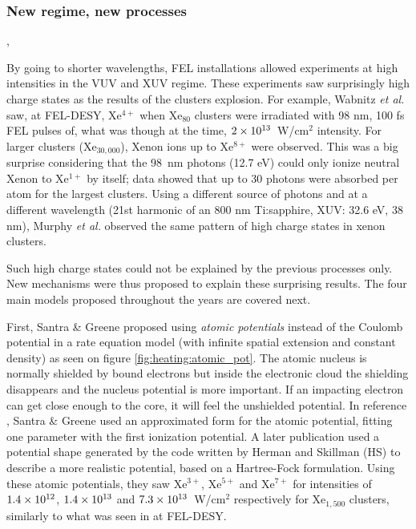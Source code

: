 \subsubsection{New regime, new processes}
\label{section:intro:mechanisms:new},

By going to shorter wavelengths, FEL installations allowed experiments at high
intensities in the VUV and XUV regime. These experiments saw surprisingly
high charge states as the results of the clusters
explosion\cite{Wabnitz2002,Bostedt2010}. For example, Wabnitz \textit{et al.}
saw, at FEL-DESY, Xe$^{4+}$ when Xe$_{80}$ clusters were irradiated with 98 nm,
100 fs FEL pulses of, what was though at the time, $\ten{2}{13}$~W/cm$^2$
intensity. For larger clusters (Xe$_{30,000}$), Xenon
ions
up to
Xe$^{8+}$ were observed. This was a big surprise considering that the 98~nm
photons (12.7 eV) could only ionize neutral Xenon to Xe$^{1+}$ by itself;
data showed that up to 30 photons were absorbed per atom for the largest
clusters. Using a different source of photons and at a different wavelength
(21st harmonic of an 800 nm Ti:sapphire, XUV: 32.6 eV, 38 nm),
Murphy \textit{et al.} observed the same pattern of high charge states in xenon
clusters\cite{Murphy2008a,Murphy2008b}.

Such high charge states could not be explained by the previous processes only.
New mechanisms were thus proposed to explain these surprising results.
The four main models proposed throughout the years are covered next.



First, Santra \& Greene proposed using \textit{atomic potentials} instead of
the Coulomb potential in a rate equation model (with infinite
spatial
%
extension and
constant density) as seen on figure \ref{fig:heating:atomic_pot}.
The atomic nucleus is normally shielded by bound electrons but inside the
electronic cloud the shielding disappears and the nucleus potential is more
important. If an impacting electron can get close enough to the core, it will
feel the unshielded potential.
In reference \cite{Greene2003}, Santra \& Greene used an approximated form for
the atomic potential, fitting one parameter with the first ionization potential.
A later\cite{Walters2006} publication used a
potential shape generated by the code written by Herman and
Skillman\cite{HS1963} (HS) to describe a more
realistic
%
potential, based on a
Hartree-Fock formulation. Using these atomic potentials, they saw Xe$^{3+}$,
Xe$^{5+}$ and Xe$^{7+}$ for intensities of $\ten{1.4}{12}$, $\ten{1.4}{13}$ and
$\ten{7.3}{13}$~W/cm$^2$ respectively for Xe$_{1,500}$ clusters, similarly to
what was seen in at FEL-DESY.


